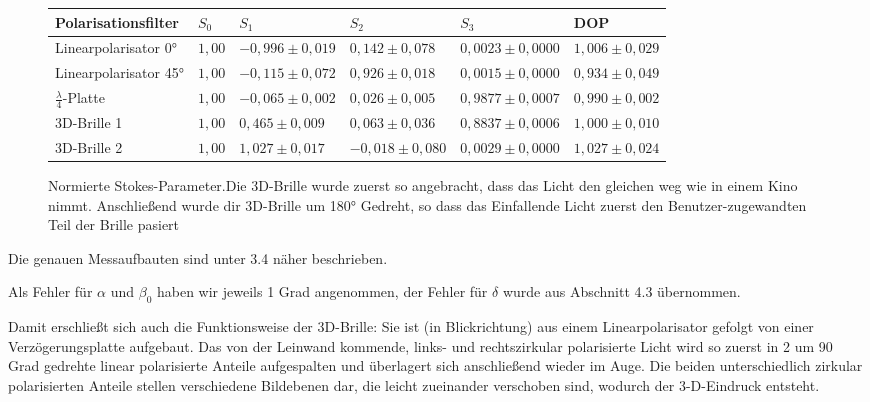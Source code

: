 \documentclass[bigchapter,colorback,accentcolor=tud4b,linedtoc,11pt]{tudreport}
\begin{document}
\begin{figure}[h]
  \begin{center}
    \begin{tabular}{|p{3.6cm}|p{0.9cm}|p{2.7cm}|p{2.7cm}|p{2.7cm}|p{2.3cm}|}
      \hline
      Polarisationsfilter        & $S_0$   & $S_1$              & $S_2$              & $S_3$               & DOP               \\ \hline
      Linearpolarisator 0°       & $1,00 $ & $-0,996 \pm 0,019$ & $0,142 \pm 0,078$  & $0,0023 \pm 0,0000$ & $1,006 \pm 0,029$ \\ \hline
      Linearpolarisator 45°      & $1,00 $ & $-0,115 \pm 0,072$ & $0,926 \pm 0,018$  & $0,0015 \pm 0,0000$ & $0,934 \pm 0,049$ \\ \hline
      $\frac{\lambda}{4}$-Platte & $1,00 $ & $-0,065 \pm 0,002$ & $0,026 \pm 0,005$  & $0,9877 \pm 0,0007$ & $0,990 \pm 0,002$ \\ \hline
      3D-Brille 1                & $1,00 $ & $0,465 \pm 0,009$  & $0,063 \pm 0,036$  & $0,8837 \pm 0,0006$ & $1,000 \pm 0,010$ \\ \hline
      3D-Brille 2                & $1,00 $ & $1,027 \pm 0,017$  & $-0,018 \pm 0,080$ & $0,0029 \pm 0,0000$ & $1,027 \pm 0,024$ \\ \hline
    \end{tabular}
  \end{center}
  \caption{Normierte Stokes-Parameter.Die 3D-Brille wurde zuerst so angebracht, dass das Licht den gleichen weg wie in einem Kino nimmt. Anschließend wurde dir 3D-Brille um 180° Gedreht, so dass das Einfallende Licht zuerst den Benutzer-zugewandten Teil der Brille pasiert}
\end{figure}

Die genauen Messaufbauten sind unter 3.4 näher beschrieben.

Als Fehler für $\alpha$ und $\beta_0$ haben wir jeweils 1 Grad angenommen, der Fehler für $\delta$ wurde aus Abschnitt 4.3 übernommen.

Damit erschließt sich auch die Funktionsweise der 3D-Brille:
Sie ist (in Blickrichtung) aus einem Linearpolarisator gefolgt von einer Verzögerungsplatte aufgebaut. Das von der Leinwand kommende, links- und rechtszirkular polarisierte Licht wird so zuerst in 2 um 90 Grad gedrehte linear polarisierte Anteile aufgespalten und überlagert sich anschließend wieder im Auge. Die beiden unterschiedlich zirkular polarisierten Anteile stellen verschiedene Bildebenen dar, die leicht zueinander verschoben sind, wodurch der 3-D-Eindruck entsteht.
\end{document}
